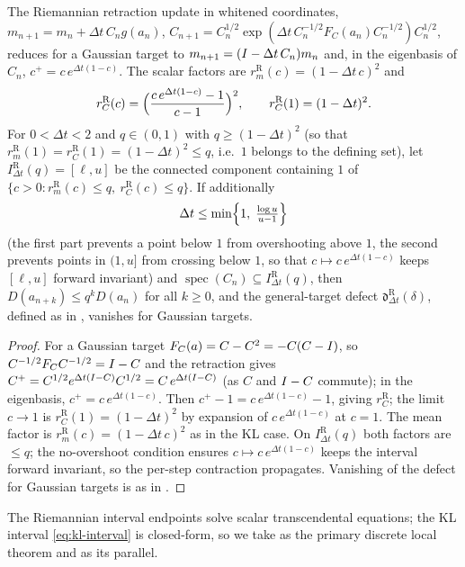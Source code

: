 \begin{proposition}
\label{prop:riem-gauss}
The Riemannian retraction update in whitened coordinates,
$m_{n+1}=m_n+\Delta t\,C_ng(a_n)$, $C_{n+1}=C_n^{1/2}\exp(\Delta t\,C_n^{-1/2}F_C(a_n)C_n^{-1/2})C_n^{1/2}$,
reduces for a Gaussian target to $m_{n+1}=(I-\Delta t\,C_n)m_n$ and, in the eigenbasis of
$C_n$, $c^+=c\,e^{\Delta t(1-c)}$. The scalar factors are $r_m^{\mathrm R}(c)=(1-\Delta t\,c)^2$
and
\[
    r_C^{\mathrm R}(c)=\Bigl(\frac{c\,e^{\Delta t(1-c)}-1}{c-1}\Bigr)^2,
    \qquad r_C^{\mathrm R}(1)=(1-\Delta t)^2 .
\]
For $0<\Delta t<2$ and $q\in(0,1)$ with $q\geq(1-\Delta t)^2$ (so that
$r_m^{\mathrm R}(1)=r_C^{\mathrm R}(1)=(1-\Delta t)^2\leq q$, i.e.\ $1$ belongs to the
defining set), let $I_{\Delta t}^{\mathrm R}(q)=[\ell,u]$ be the connected component
containing $1$ of $\{c>0:r_m^{\mathrm R}(c)\leq q,\ r_C^{\mathrm R}(c)\leq q\}$. If
additionally
\[
    \Delta t\leq\min\Bigl\{1,\;\tfrac{\log u}{u-1}\Bigr\}
\]
(the first part prevents a point below $1$ from overshooting above $1$, the second prevents
points in $(1,u]$ from crossing below $1$, so that $c\mapsto c\,e^{\Delta t(1-c)}$ keeps
$[\ell,u]$ forward invariant) and $\operatorname{spec}(C_n)\subseteq I_{\Delta t}^{\mathrm R}(q)$,
then $D(a_{n+k})\leq q^kD(a_n)$ for all $k\geq0$, and the general-target defect
$\mathfrak d_{\Delta t}^{\mathrm R}(\delta)$, defined as in , vanishes
for Gaussian targets.
\end{proposition}

\begin{proof}
For a Gaussian target $F_C(a)=C-C^2=-C(C-I)$, so $C^{-1/2}F_CC^{-1/2}=I-C$ and the
retraction gives $C^{+}=C^{1/2}e^{\Delta t(I-C)}C^{1/2}=C\,e^{\Delta t(I-C)}$ (as $C$ and
$I-C$ commute); in the eigenbasis, $c^+=c\,e^{\Delta t(1-c)}$. Then
$c^+-1=c\,e^{\Delta t(1-c)}-1$, giving $r_C^{\mathrm R}$; the limit $c\to1$ is
$r_C^{\mathrm R}(1)=(1-\Delta t)^2$ by expansion of $c\,e^{\Delta t(1-c)}$ at $c=1$. The
mean factor is $r_m^{\mathrm R}(c)=(1-\Delta t\,c)^2$ as in the KL case. On
$I_{\Delta t}^{\mathrm R}(q)$ both factors are $\leq q$; the no-overshoot condition ensures
$c\mapsto c\,e^{\Delta t(1-c)}$ keeps the interval forward invariant, so the per-step
contraction propagates. Vanishing of the defect for Gaussian targets is as in
.
\end{proof}

The Riemannian interval endpoints solve scalar transcendental equations; the KL interval
\eqref{eq:kl-interval} is closed-form, so we take  as the primary
discrete local theorem and  as its parallel.

